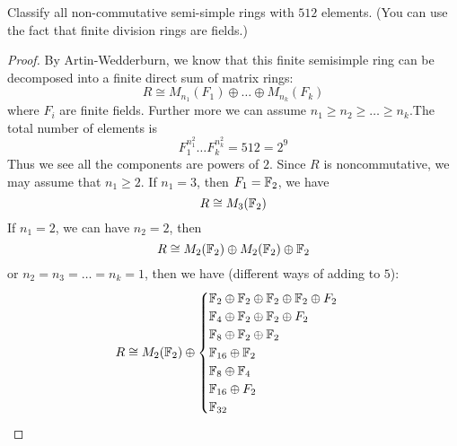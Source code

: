 \begin{prob}[S2010-Q5]
    Classify all non-commutative semi-simple rings with $512$ elements.
(You can use the fact that finite division rings are fields.)
\end{prob}
\begin{proof}
    By Artin-Wedderburn, we know that this finite semisimple ring can be decomposed into a finite direct sum of matrix rings:
    \begin{equation*}
        R\cong M_{n_1}(F_1)\oplus\dots\oplus M_{n_k}(F_k)
    \end{equation*}
    where $F_i$ are finite fields. Further more we can assume $n_1\geq n_2\geq\dots\geq n_k$.The total number of elements is 
    \begin{equation*}
        F_1^{n_1^2}\dots F_k^{n_k^2}=512=2^9
    \end{equation*}
    Thus we see all the components are powers of $2$. Since $R$ is noncommutative, we may assume that $n_1\geq 2$. If $n_1=3$, then $F_1=\mathbb{F}_2$, we have 
    \begin{equation*}
        R\cong M_{3}(\mathbb{F}_2)
    \end{equation*}
    If $n_1=2$, we can have $n_2=2$, then 
    \begin{equation*}
        R\cong M_2(\mathbb{F}_2)\oplus M_2(\mathbb{F}_2)\oplus \mathbb{F}_2
    \end{equation*}
    or $n_2=n_3=\dots=n_k=1$, then we have (different ways of adding to $5$):
    \begin{equation*}
        R\cong M_2(\mathbb{F}_2)\oplus\begin{cases}
            \mathbb{F}_2\oplus\mathbb{F}_2\oplus\mathbb{F}_2\oplus\mathbb{F}_2\oplus F_2\\
            \mathbb{F}_{4}\oplus \mathbb{F}_2\oplus\mathbb{F}_2\oplus F_2\\
            \mathbb{F}_8\oplus\mathbb{F}_2\oplus\mathbb{F}_2\\
            \mathbb{F}_{16}\oplus\mathbb{F}_2\\
            \mathbb{F}_8\oplus\mathbb{F}_4\\
            \mathbb{F}_{16}\oplus F_2\\
            \mathbb{F}_{32}
        \end{cases}
    \end{equation*}



    
\end{proof}

